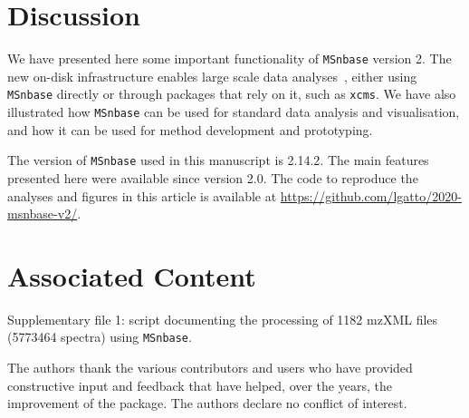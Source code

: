 \documentclass[journal=jacsat,manuscript=article]{achemso}\usepackage[]{graphicx}\usepackage[]{color}
\begin{document}
\section{Discussion}

We have presented here some important functionality of
\texttt{MSnbase} version 2. The new on-disk infrastructure enables
large scale data analyses~\cite{Nothias:2020}, either using
\texttt{MSnbase} directly or through packages that rely on it, such as
\texttt{xcms}. We have also illustrated how \texttt{MSnbase} can be
used for standard data analysis and visualisation, and how it can be
used for method development and prototyping.



The version of \texttt{MSnbase} used in this manuscript is
2.14.2. The main features presented here were available since
version 2.0. The code to reproduce the analyses and figures in this
article is available at
\url{https://github.com/lgatto/2020-msnbase-v2/}.

\section{Associated Content}

Supplementary file 1: script documenting the processing of 1182 mzXML
files (5773464 spectra) using \texttt{MSnbase}.


\begin{acknowledgement}

The authors thank the various contributors and users who have provided
constructive input and feedback that have helped, over the years, the
improvement of the package. The authors declare no conflict of
interest.

\end{acknowledgement}




\end{document}
